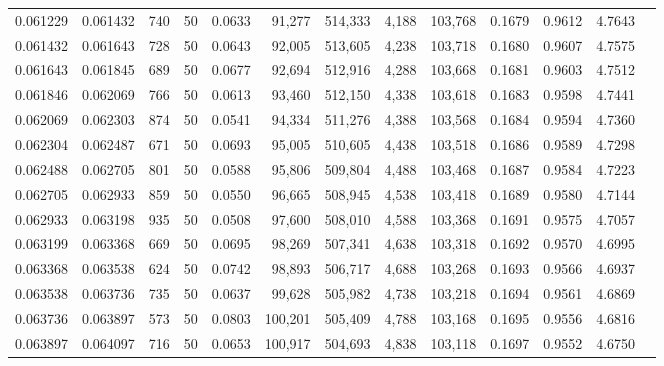 \begin{tabular}{rrrrrrrrrrrrr}
0.061229 & 0.061432 &   740 &  50 &                                     0.0633 &  91,277 & 514,333 &   4,188 & 103,768 & 0.1679 & 0.9612 & 4.7643 \\
0.061432 & 0.061643 &   728 &  50 &                                     0.0643 &  92,005 & 513,605 &   4,238 & 103,718 & 0.1680 & 0.9607 & 4.7575 \\
0.061643 & 0.061845 &   689 &  50 &                                     0.0677 &  92,694 & 512,916 &   4,288 & 103,668 & 0.1681 & 0.9603 & 4.7512 \\
0.061846 & 0.062069 &   766 &  50 &                                     0.0613 &  93,460 & 512,150 &   4,338 & 103,618 & 0.1683 & 0.9598 & 4.7441 \\
0.062069 & 0.062303 &   874 &  50 &                                     0.0541 &  94,334 & 511,276 &   4,388 & 103,568 & 0.1684 & 0.9594 & 4.7360 \\
0.062304 & 0.062487 &   671 &  50 &                                     0.0693 &  95,005 & 510,605 &   4,438 & 103,518 & 0.1686 & 0.9589 & 4.7298 \\
0.062488 & 0.062705 &   801 &  50 &                                     0.0588 &  95,806 & 509,804 &   4,488 & 103,468 & 0.1687 & 0.9584 & 4.7223 \\
0.062705 & 0.062933 &   859 &  50 &                                     0.0550 &  96,665 & 508,945 &   4,538 & 103,418 & 0.1689 & 0.9580 & 4.7144 \\
0.062933 & 0.063198 &   935 &  50 &                                     0.0508 &  97,600 & 508,010 &   4,588 & 103,368 & 0.1691 & 0.9575 & 4.7057 \\
0.063199 & 0.063368 &   669 &  50 &                                     0.0695 &  98,269 & 507,341 &   4,638 & 103,318 & 0.1692 & 0.9570 & 4.6995 \\
0.063368 & 0.063538 &   624 &  50 &                                     0.0742 &  98,893 & 506,717 &   4,688 & 103,268 & 0.1693 & 0.9566 & 4.6937 \\
0.063538 & 0.063736 &   735 &  50 &                                     0.0637 &  99,628 & 505,982 &   4,738 & 103,218 & 0.1694 & 0.9561 & 4.6869 \\
0.063736 & 0.063897 &   573 &  50 &                                     0.0803 & 100,201 & 505,409 &   4,788 & 103,168 & 0.1695 & 0.9556 & 4.6816 \\
0.063897 & 0.064097 &   716 &  50 &                                     0.0653 & 100,917 & 504,693 &   4,838 & 103,118 & 0.1697 & 0.9552 & 4.6750 \\

\end{tabular}
